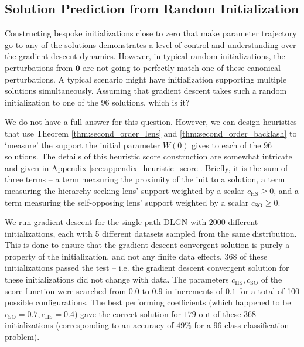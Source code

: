 \documentclass{article}
\theoremstyle{plain}
\theoremstyle{definition}
\theoremstyle{remark}
\newcommand{\1}{{\mathbf 1}}
\newcommand{\0}{{\mathbf 0}}
\newcommand{\w}{{\mathbf w}}
\renewcommand{\>}{{\rightarrow}}
\begin{document}
\subsection{Solution Prediction from Random Initialization}
\label{sec:trajectory_prediction}


Constructing bespoke initializations close to zero that make parameter trajectory go to any of the solutions demonstrates a level of control and understanding over the gradient descent dynamics. However, in typical random initializations, the perturbations from $\0$ are not going to perfectly match one of these canonical perturbations. A typical scenario might have initialization supporting multiple solutions simultaneously. Assuming that gradient descent takes such a  random initialization to one of the $96$ solutions, which is it?


We do not have a full answer for this question. However, we can design heuristics that use Theorem \ref{thm:second_order_lens} and \ref{thm:second_order_backlash} to `measure' the support the initial parameter $W(0)$ gives to each of the $96$ solutions. The details of this heuristic score construction are  somewhat intricate and given in Appendix \ref{sec:appendix_heuristic_score}. Briefly, it is the sum of three terms -- a term measuring the proximity of the init to a solution, a term measuring the hierarchy seeking lens' support weighted by a scalar $c_{\text{HS}}\geq 0$,  and a term measuring the self-opposing lens' support weighted by a scalar $c_{\text{SO}}\geq 0$. 


We run gradient descent for the single path DLGN with $2000$ different initializations, each with 5 different datasets sampled from the same distribution. This is done to ensure that the gradient descent convergent solution is purely a property of the initialization, and not any finite data effects. $368$ of these initializations passed the test -- i.e. the gradient descent convergent solution for these initializations did not change with data. The parameters $c_{\text{HS}}, c_{\text{SO}}$ of the score function were searched from $0.0$ to $0.9$ in increments of $0.1$ for a total of 100 possible configurations. The best performing coefficients (which happened to be $c_\text{SO}=0.7, c_\text{HS}=0.4$) gave the correct solution for $179$ out of these $368$ initializations (corresponding to an accuracy of $49\%$ for a $96$-class classification problem). 
\end{document}
